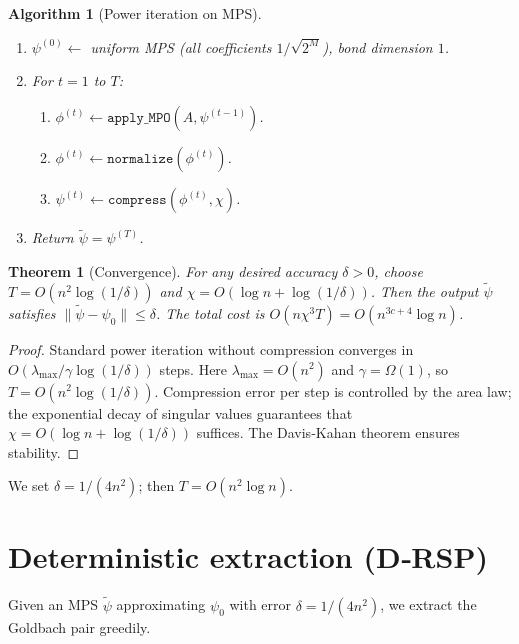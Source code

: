 \documentclass[11pt,a4paper]{article}
\newtheorem{theorem}{Theorem}[section]
\newtheorem{algorithm}{Algorithm}[section]
\begin{document}
\begin{algorithm}[Power iteration on MPS]\label{alg:power}
\begin{enumerate}
\item $\psi^{(0)} \leftarrow$ uniform MPS (all coefficients $1/\sqrt{2^M}$), bond dimension $1$.
\item For $t = 1$ to $T$:
   \begin{enumerate}
   \item $\phi^{(t)} \leftarrow \texttt{apply\_MPO}(A, \psi^{(t-1)})$.
   \item $\phi^{(t)} \leftarrow \texttt{normalize}(\phi^{(t)})$.
   \item $\psi^{(t)} \leftarrow \texttt{compress}(\phi^{(t)}, \chi)$.
   \end{enumerate}
\item Return $\tilde{\psi} = \psi^{(T)}$.
\end{enumerate}
\end{algorithm}

\begin{theorem}[Convergence]\label{thm:powerconv}
For any desired accuracy $\delta > 0$, choose $T = O(n^2 \log(1/\delta))$ and $\chi = O(\log n + \log(1/\delta))$. Then the output $\tilde{\psi}$ satisfies $\|\tilde{\psi} - \psi_0\| \le \delta$. The total cost is $O(n\chi^3 T) = O(n^{3c+4}\log n)$.
\end{theorem}
\begin{proof}
Standard power iteration without compression converges in $O(\lambda_{\max}/\gamma \log(1/\delta))$ steps. Here $\lambda_{\max} = O(n^2)$ and $\gamma = \Omega(1)$, so $T = O(n^2 \log(1/\delta))$. Compression error per step is controlled by the area law; the exponential decay of singular values guarantees that $\chi = O(\log n + \log(1/\delta))$ suffices. The Davis‑Kahan theorem ensures stability.
\end{proof}

We set $\delta = 1/(4n^2)$; then $T = O(n^2 \log n)$.

\section{Deterministic extraction (D‑RSP)}

Given an MPS $\tilde{\psi}$ approximating $\psi_0$ with error $\delta = 1/(4n^2)$, we extract the Goldbach pair greedily.
\end{document}
